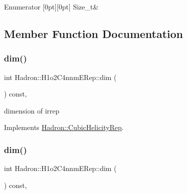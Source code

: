 \begin{DoxyEnumFields}{Enumerator}
[0pt][0pt]{}\mbox{\label{structHadron_1_1H1o2C4nnmERep_acdece54d2b38e45f3244132ddb1fcd6caa083020386ff21889d30cb1ace684e6f}} 
Size\+\_\+t&\\
\hline

\end{DoxyEnumFields}


\subsection{Member Function Documentation}
\mbox{\label{structHadron_1_1H1o2C4nnmERep_a5143b2b23d7dcc59df93fe4f3bb0222c}} 
\subsubsection{\texorpdfstring{dim()}{dim()}\hspace{0.1cm}{\footnotesize\ttfamily [1/3]}}
{\footnotesize\ttfamily int Hadron\+::\+H1o2\+C4nnm\+E\+Rep\+::dim (\begin{DoxyParamCaption}{ }\end{DoxyParamCaption}) const\hspace{0.3cm}{\ttfamily [inline]}, {\ttfamily [virtual]}}

dimension of irrep 

Implements \mbox{\hyperlink{structHadron_1_1CubicHelicityRep_a95d229a05580e65f8bdde74a1e316855}{Hadron\+::\+Cubic\+Helicity\+Rep}}.

\mbox{\label{structHadron_1_1H1o2C4nnmERep_a5143b2b23d7dcc59df93fe4f3bb0222c}} 
\subsubsection{\texorpdfstring{dim()}{dim()}\hspace{0.1cm}{\footnotesize\ttfamily [2/3]}}
{\footnotesize\ttfamily int Hadron\+::\+H1o2\+C4nnm\+E\+Rep\+::dim (\begin{DoxyParamCaption}{ }\end{DoxyParamCaption}) const\hspace{0.3cm}{\ttfamily [inline]}, {\ttfamily [virtual]}}


